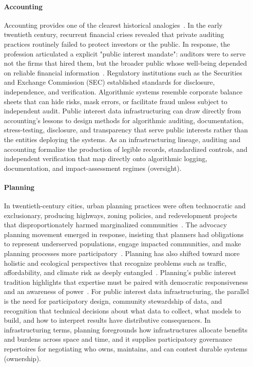 \documentclass[acmsmall,screen]{acmart}
\begin{document}
\paragraph*{Accounting}
Accounting provides one of the clearest historical analogies~\cite{carnegieCriticalInterpretiveHistories1996,leeProfessionalizationAccountancyHistory1995}. In the early twentieth century, recurrent financial crises revealed that private auditing practices routinely failed to protect investors or the public. In response, the profession articulated a explicit "public interest mandate": auditors were to serve not the firms that hired them, but the broader public whose well-being depended on reliable financial information~\cite{quayleWhistleblowingAccountingPublic2021,bakerWhatMeaningPublic2005,dellaportasReflectionsPublicInterest2008}. Regulatory institutions such as the Securities and Exchange Commission (SEC) established standards for disclosure, independence, and verification. Algorithmic systems resemble corporate balance sheets that can hide risks, mask errors, or facilitate fraud unless subject to independent audit. Public interest data infrastructuring can draw directly from accounting's lessons to design methods for algorithmic auditing, documentation, stress-testing, disclosure, and transparency that serve public interests rather than the entities deploying the systems. As an infrastructuring lineage, auditing and accounting formalize the production of legible records, standardized controls, and independent verification that map directly onto algorithmic logging, documentation, and impact-assessment regimes (oversight).

\paragraph*{Planning}
In twentieth-century cities, urban planning practices were often technocratic and exclusionary, producing highways, zoning policies, and redevelopment projects that disproportionately harmed marginalized communities~\cite{jacobs1961death,doryClashUrbanPhilosophies2018,guttenbergPlanningIdeology2009}. The advocacy planning movement emerged in response, insisting that planners had obligations to represent underserved populations, engage impacted communities, and make planning processes more participatory~\cite{dadashpoorDefiningPublicInterest2021}. Planning has also shifted toward more holistic and ecological perspectives that recognize problems such as traffic, affordability, and climate risk as deeply entangled~\cite{hirtPremodernModernPostmodern2009,roheLocalGlobalOne2009}. Planning's public interest tradition highlights that expertise must be paired with democratic responsiveness and an awareness of power~\cite{lanePublicParticipationPlanning2005}. For public interest data infrastructuring, the parallel is the need for participatory design, community stewardship of data, and recognition that technical decisions about what data to collect, what models to build, and how to interpret results have distributive consequences. In infrastructuring terms, planning foregrounds how infrastructures allocate benefits and burdens across space and time, and it supplies participatory governance repertoires for negotiating who owns, maintains, and can contest durable systems (ownership).
\end{document}
